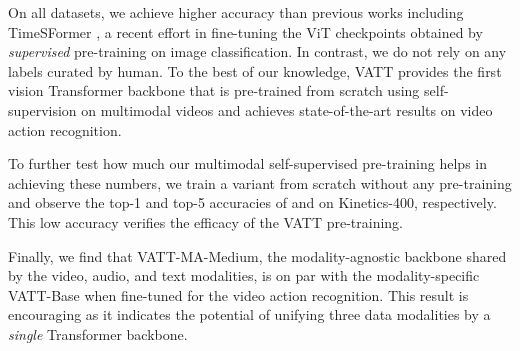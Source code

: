 \documentclass[10pt,twocolumn,letterpaper]{article}
\newcommand{\ours}{VATT\xspace}
\begin{document}
On all datasets, we achieve higher accuracy than previous works including TimeSFormer \cite{bertasius2021space}, a recent effort in fine-tuning the ViT checkpoints obtained by \textit{supervised} pre-training on image classification. In contrast, we do not rely on any labels curated by human. To the best of our knowledge, \ours provides the first vision Transformer backbone that is pre-trained from scratch using self-supervision on multimodal videos and achieves state-of-the-art results on video action recognition.

To further test how much our multimodal self-supervised pre-training helps in achieving these numbers, we train a variant from scratch without any pre-training and observe the top-1 and top-5 accuracies of  and  on Kinetics-400, respectively. This low accuracy verifies the efficacy of the \ours pre-training. 

Finally, we find that VATT-MA-Medium, the modality-agnostic backbone shared by the video, audio, and text modalities, is on par with the modality-specific VATT-Base when fine-tuned for the video action recognition. This result is encouraging as it indicates the potential of unifying three data modalities by a \textit{single} Transformer backbone.
\end{document}
